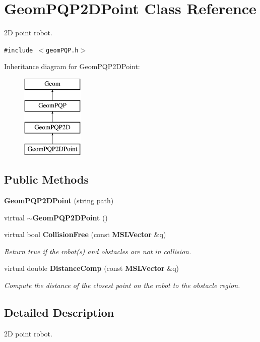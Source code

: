 \section{Geom\-PQP2DPoint  Class Reference}
\label{class_GeomPQP2DPoint}
2D point robot. 


{\tt \#include $<$geom\-PQP.h$>$}

Inheritance diagram for Geom\-PQP2DPoint:\begin{figure}[H]
\begin{center}
\leavevmode
\includegraphics[height=4cm]{class_GeomPQP2DPoint}
\end{center}
\end{figure}
\subsection*{Public Methods}
\begin{CompactItemize}
\item 
{\bf Geom\-PQP2DPoint} (string path)
\item 
virtual {\bf $\sim$Geom\-PQP2DPoint} ()
\item 
virtual bool {\bf Collision\-Free} (const {\bf MSLVector} \&q)
\begin{CompactList}\small\item\em Return true if the robot(s) and obstacles are not in collision.\item\end{CompactList}\item 
virtual double {\bf Distance\-Comp} (const {\bf MSLVector} \&q)
\begin{CompactList}\small\item\em Compute the distance of the closest point on the robot to the obstacle region.\item\end{CompactList}\end{CompactItemize}


\subsection{Detailed Description}
2D point robot.





